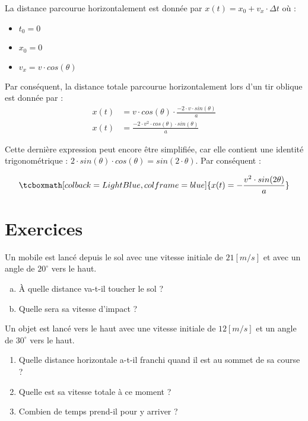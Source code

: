 La distance parcourue horizontalement est donnée par \(x(t)=x_0+v_x \cdot \Delta t\) où :
\begin{itemize}[label=\textbullet]
    \item \(t_0=0\)
    \item \(x_0=0\)
    \item \(v_x=v \cdot cos(\theta)\)
\end{itemize}

Par conséquent, la distance totale parcourue horizontalement lors d'un tir oblique est donnée par :
\begin{align}
    x(t) & =v \cdot cos(\theta) \cdot \frac{-2 \cdot v \cdot sin(\theta)}{a} \\
    x(t) & =\frac{-2 \cdot v^2 \cdot cos(\theta) \cdot sin(\theta)}{a}
\end{align}

Cette dernière expression peut encore être simplifiée, car elle contient une identité trigonométrique : \(2 \cdot sin(\theta) \cdot cos(\theta)=sin(2 \cdot \theta )\).
Par conséquent :

\begin{equation}
    \tcboxmath[colback=LightBlue,colframe=blue]
    {x(t)=-\frac{v^2 \cdot sin(2 \theta)}{a}}
\end{equation}

\newpage

\section{Exercices}
\begin{exercise}
    Un mobile est lancé depuis le sol avec une vitesse initiale de \(21[m/s]\) et avec un angle de \(20^{\circ}\) vers le haut.
    \begin{enumerate}[a)]
        \item À quelle distance va-t-il toucher le sol ?
        \item Quelle sera sa vitesse d'impact ?
    \end{enumerate}
\end{exercise}

\begin{exercise}
    Un objet est lancé vers le haut avec une vitesse initiale de \(12[m/s]\) et un angle de \(30^{\circ}\) vers le haut.
    \begin{enumerate}
        \item Quelle distance horizontale a-t-il franchi quand il est au sommet de sa course ?
        \item Quelle est sa vitesse totale à ce moment ?
        \item Combien de temps prend-il pour y arriver ?
    \end{enumerate}
\end{exercise}


